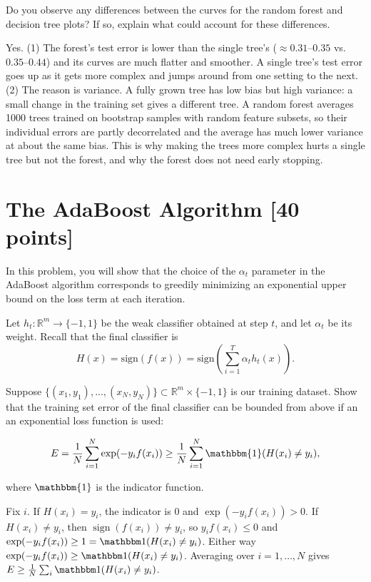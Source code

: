 \documentclass{article}
\begin{document}
\problem[4]
Do you observe any differences between the curves for the random forest and decision tree plots? If so, explain what could account for these differences.

\begin{solution}
\upshape
Yes. (1) The forest's test error is lower than the single tree's ($\approx 0.31$--$0.35$ vs.\ $0.35$--$0.44$) and its curves are much flatter and smoother. A single tree's test error goes up as it gets more complex and jumps around from one setting to the next.
(2) The reason is variance. A fully grown tree has low bias but high variance: a small change in the training set gives a different tree.
A random forest averages 1000 trees trained on bootstrap samples with random feature subsets, so their individual errors are partly decorrelated and the average has much lower variance
at about the same bias. This is why making the trees more complex hurts a single tree but not the forest, and why the forest does not need early stopping.
\end{solution}



\newpage
\section{The AdaBoost Algorithm [40 points]}

In this problem, you will show that the choice of the $\alpha_t$ parameter in
the AdaBoost algorithm corresponds to greedily minimizing an exponential upper
bound on the loss term at each iteration.

\problem[3]
Let $h_t: \mathbb{R}^m \rightarrow \{-1,1\}$ be the weak classifier obtained at step $t$, and let $\alpha_t$ be
its weight. Recall that the final classifier is $$H(x) = \text{sign}(f(x)) = \text{sign} \left(\sum\limits_{i=1}^T \alpha_{t}h_t(x) \right).$$

Suppose $\{(x_1, y_1), ..., (x_N, y_N)\} \subset \mathbb{R}^m \times \{-1,1\}$ is our training dataset.  Show that the training set error of the final classifier can be bounded from
above if an an exponential loss function is used:

$$E = \frac{1}{N} \sum\limits_{i=1}^N \exp(-y_{i}f(x_i)) \geq \frac{1}{N} \sum\limits_{i=1}^N \mathbbm{1}(H(x_i) \neq y_i),$$

where $\mathbbm{1}$ is the indicator function.

\begin{solution}
\upshape
Fix $i$. If $H(x_i)=y_i$, the indicator is $0$ and $\exp(-y_if(x_i))>0$. If $H(x_i)\neq y_i$, then $\operatorname{sign}(f(x_i))\ne y_i$, so $y_if(x_i)\le 0$ and $\exp(-y_if(x_i))\ge 1=\mathbbm 1(H(x_i)\neq y_i)$.
Either way $\exp(-y_if(x_i))\ge \mathbbm 1(H(x_i)\ne y_i)$. Averaging over $i=1,\dots,N$ gives $E\ge \frac1N\sum_i\mathbbm 1(H(x_i)\ne y_i)$.
\end{solution}
\end{document}
